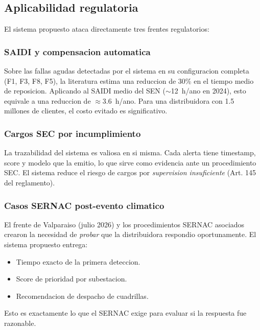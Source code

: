 \subsection{Aplicabilidad regulatoria}

El sistema propuesto ataca directamente tres frentes regulatorios:

\subsubsection{SAIDI y compensacion automatica}

Sobre las fallas agudas detectadas por el sistema en su
configuracion completa (F1, F3, F8, F5), la literatura estima una
reduccion de 30\% en el tiempo medio de reposicion. Aplicando al
SAIDI medio del SEN ($\sim$12~h/ano en 2024), esto equivale a una
reduccion de $\approx 3.6$~h/ano. Para una distribuidora con
1.5 millones de clientes, el costo evitado es significativo.

\subsubsection{Cargos SEC por incumplimiento}

La trazabilidad del sistema es valiosa en si misma. Cada alerta
tiene timestamp, score y modelo que la emitio, lo que sirve como
evidencia ante un procedimiento SEC. El sistema reduce el riesgo
de cargos por \emph{supervision insuficiente} (Art. 145 del
reglamento).

\subsubsection{Casos SERNAC post-evento climatico}

El frente de Valparaiso (julio 2026) y los procedimientos SERNAC
asociados crearon la necesidad de \emph{probar} que la distribuidora
respondio oportunamente. El sistema propuesto entrega:

\begin{itemize}[leftmargin=*,itemsep=2pt]
  \item Tiempo exacto de la primera deteccion.
  \item Score de prioridad por subestacion.
  \item Recomendacion de despacho de cuadrillas.
\end{itemize}

Esto es exactamente lo que el SERNAC exige para evaluar si la
respuesta fue razonable.

